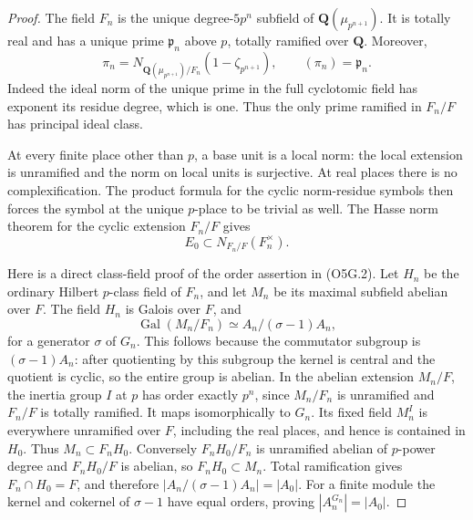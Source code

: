 \documentclass[11pt,a4paper]{article}
\theoremstyle{definition}
\begin{document}
\begin{proof}
The field $F_n$ is the unique degree-$5p^n$ subfield of
$\mathbf Q(\mu_{p^{n+1}})$.  It is totally real and has a unique
prime $\mathfrak p_n$ above $p$, totally ramified over $\mathbf Q$.
Moreover,
\[
 \pi_n=N_{\mathbf Q(\mu_{p^{n+1}})/F_n}
                       (1-\zeta_{p^{n+1}}),\qquad
                    (\pi_n)=\mathfrak p_n.              \tag{O5G.4}
\]
Indeed the ideal norm of the unique prime in the full cyclotomic
field has exponent its residue degree, which is one.  Thus the
only prime ramified in $F_n/F$ has principal ideal class.

At every finite place other than $p$, a base unit is a local norm:
the local extension is unramified and the norm on local units is
surjective.  At real places there is no complexification.
The product formula for the cyclic norm-residue symbols then
forces the symbol at the unique $p$-place to be trivial as well.
The Hasse norm theorem for the cyclic extension $F_n/F$ gives
\[
                    E_0\subset N_{F_n/F}(F_n^{\times}). \tag{O5G.5}
\]

Here is a direct class-field proof of the order assertion in
(O5G.2).  Let $H_n$ be the ordinary Hilbert $p$-class field of
$F_n$, and let $M_n$ be its maximal subfield abelian over $F$.
The field $H_n$ is Galois over $F$, and
\[
 \operatorname{Gal}(M_n/F_n)
       \simeq A_n/(\sigma-1)A_n,                       \tag{O5G.6}
\]
for a generator $\sigma$ of $G_n$.
This follows because the commutator subgroup is
$(\sigma-1)A_n$: after quotienting by this subgroup the kernel
is central and the quotient is cyclic, so the entire group is
abelian.  In the abelian extension $M_n/F$, the inertia group
$I$ at $p$ has order exactly $p^n$, since $M_n/F_n$ is
unramified and $F_n/F$ is totally ramified.  It maps
isomorphically to $G_n$.  Its fixed field $M_n^I$ is everywhere
unramified over $F$, including the real places, and hence is
contained in $H_0$.  Thus $M_n\subset F_nH_0$.
Conversely $F_nH_0/F_n$ is unramified abelian of $p$-power degree
and $F_nH_0/F$ is abelian, so $F_nH_0\subset M_n$.
Total ramification gives $F_n\cap H_0=F$, and therefore
$|A_n/(\sigma-1)A_n|=|A_0|$.
For a finite module the kernel and cokernel of $\sigma-1$
have equal orders, proving $|A_n^{G_n}|=|A_0|$.


\end{proof}
\end{document}
